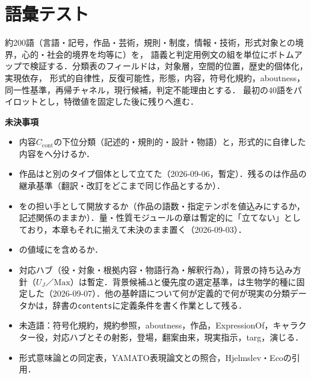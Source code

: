 \documentclass[../../main-detail.tex]{subfiles}
\begin{document}
\section{語彙テスト}
約200語（言語・記号，作品・芸術，規則・制度，情報・技術，形式対象との境界，心的・社会的境界を均等に）を，
語義と判定用例文の組を単位にボトムアップで検証する．分類表のフィールドは，対象層，空間的位置，歴史的個体化，実現依存，
形式的自律性，反復可能性，形態，内容，符号化規約，aboutness，同一性基準，再帰チャネル，現行候補，判定不能理由とする．
最初の40語をパイロットとし，特徴値を固定した後に残りへ進む．

\begin{devbox}
\textbf{未決事項}
\begin{itemize}
    \item 内容$C_{\mathrm{cont}}$の下位分類（記述的・規則的・設計・物語）と，形式的に自律した内容をへ分けるか．
    \item 作品はと別のタイプ個体として立てた（2026-09-06，暫定）．残るのは作品の継承基準（翻訳・改訂をどこまで同じ作品とするか）．
    \item {}をの担い手として開放するか（作品の語数・指定テンポを値込みにするか，記述関係のままか）．量・性質モジュールの章は暫定的に「立てない」としており，本章もそれに揃えて未決のまま置く（2026-09-03）．
    \item {}の値域にを含めるか．
    \item 対応ハブ（役・対象・根拠内容・物語行為・解釈行為），背景の持ち込み方針（$U_J$／$\mathrm{Max}$）は暫定．背景候補$\Delta$と優先度の選定基準，は生物学的種に固定した（2026-09-07）．他の基幹語について何が定義的で何が現実の分類データかは，辞書の\texttt{contents}に定義条件を書く作業として残る．
    \item 未造語：符号化規約，規約参照，aboutness，作品，ExpressionOf，キャラクター役，対応ハブとその射影，登場，翻案由来，現実指示，targ，演じる．
    \item 形式意味論との同定表，YAMATO表現論文との照合，Hjelmslev・Ecoの引用．
\end{itemize}
\end{devbox}
\end{document}

